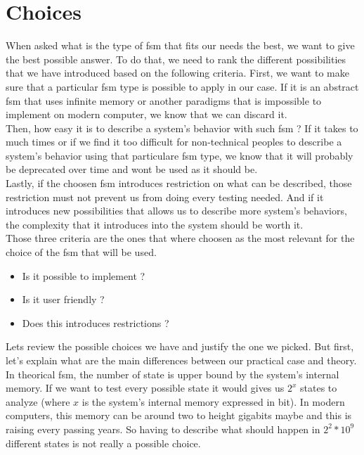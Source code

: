 \documentclass[12pt]{article}
\begin{document}
\section{Choices}

When asked what is the type of \gls{fsm} that fits our needs the best, we want to give the best possible answer. To do that, we need to rank the different possibilities that we have introduced based on the following criteria. First, we want to make sure that a particular \gls{fsm} type is possible to apply in our case. If it is an abstract \gls{fsm} that uses infinite memory or another paradigms that is impossible to implement on modern computer, we know that we can discard it.\\

Then, how easy it is to describe a system's behavior with such \gls{fsm} ? If it takes to much times or if we find it too difficult for non-technical peoples to describe a system's behavior using that particulare \gls{fsm} type, we know that it will probably be deprecated over time and wont be used as it should be.\\

Lastly, if the choosen \gls{fsm} introduces restriction on what can be described, those restriction must not prevent us from doing every testing needed. And if it introduces new possibilities that allows us to describe more system's behaviors, the complexity that it introduces into the system should be worth it.\\

Those three criteria are the ones that where choosen as the most relevant for the choice of the \gls{fsm} that will be used.

\begin{itemize}
\item Is it possible to implement ?
\item Is it user friendly ?
\item Does this introduces restrictions ?
\end{itemize}

Lets review the possible choices we have and justify the one we picked. But first, let's explain what are the main differences between our practical case and theory. In theorical \gls{fsm}, the number of state is upper bound by the system's internal memory. If we want to test every possible state it would gives us $2^x$ states to analyze (where $x$ is the system's internal memory expressed in bit). In modern computers, this memory can be around two to height gigabits maybe and this is raising every passing years. So having to describe what should happen in $2^2*10^9$ different states is not really a possible choice.\\
\end{document}
